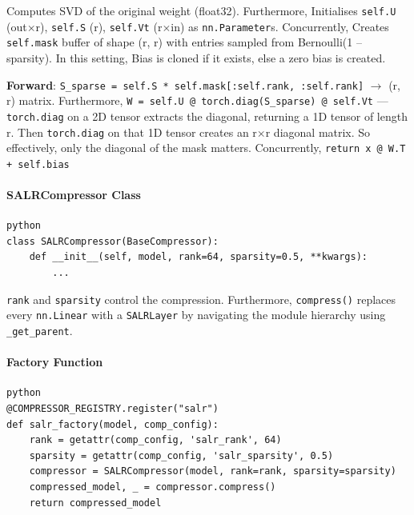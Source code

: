 Computes SVD of the original weight (float32). Furthermore, Initialises \texttt{self.U} (out$\times$r), \texttt{self.S} (r), \texttt{self.Vt} (r$\times$in) as \texttt{nn.Parameter}s. Concurrently, Creates \texttt{self.mask} buffer of shape (r, r) with entries sampled from Bernoulli(1 -- sparsity). In this setting, Bias is cloned if it exists, else a zero bias is created.


\textbf{Forward}:
\texttt{S\_sparse = self.S * self.mask[:self.rank, :self.rank]} $\rightarrow$ (r, r) matrix. Furthermore, \texttt{W = self.U @ torch.diag(S\_sparse) @ self.Vt} --- \texttt{torch.diag} on a 2D tensor extracts the diagonal, returning a 1D tensor of length r. Then \texttt{torch.diag} on that 1D tensor creates an r$\times$r diagonal matrix. So effectively, only the diagonal of the mask matters. Concurrently, \texttt{return x @ W.T + self.bias}


\paragraph{SALRCompressor Class}

\vspace{0.5em}
\begin{mdframed}[backgroundcolor=codebg, linecolor=codeframe, linewidth=1pt, roundcorner=4pt, innerleftmargin=2pt, innerrightmargin=5pt, innertopmargin=5pt, innerbottommargin=5pt]
\begin{lstlisting}
python
class SALRCompressor(BaseCompressor):
    def __init__(self, model, rank=64, sparsity=0.5, **kwargs):
        ...
\end{lstlisting}
\end{mdframed}
\vspace{0.5em}

\texttt{rank} and \texttt{sparsity} control the compression. Furthermore, \texttt{compress()} replaces every \texttt{nn.Linear} with a \texttt{SALRLayer} by navigating the module hierarchy using \texttt{\_get\_parent}.


\paragraph{Factory Function}

\vspace{0.5em}
\begin{mdframed}[backgroundcolor=codebg, linecolor=codeframe, linewidth=1pt, roundcorner=4pt, innerleftmargin=2pt, innerrightmargin=5pt, innertopmargin=5pt, innerbottommargin=5pt]
\begin{lstlisting}
python
@COMPRESSOR_REGISTRY.register("salr")
def salr_factory(model, comp_config):
    rank = getattr(comp_config, 'salr_rank', 64)
    sparsity = getattr(comp_config, 'salr_sparsity', 0.5)
    compressor = SALRCompressor(model, rank=rank, sparsity=sparsity)
    compressed_model, _ = compressor.compress()
    return compressed_model
\end{lstlisting}
\end{mdframed}
\vspace{0.5em}


